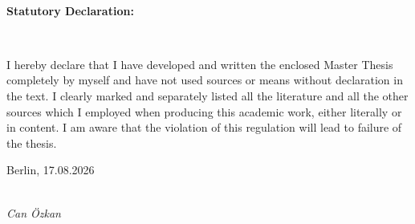 \newpage

\thispagestyle{empty}

\begin{large}

\vspace*{6cm}

\

\large{ \textbf{Statutory Declaration:} }

\

\noindent
I hereby declare that I have developed and written the enclosed Master Thesis completely by myself and have not used sources or means without declaration in the text. 
I clearly marked and separately listed all the literature and all the other sources which I employed when producing this academic work, either literally or in content. 
I am aware that the violation of this regulation will lead to failure of the thesis.
\vspace{2cm}

\noindent
Berlin, 17.08.2026

\vspace{3cm}

\hspace*{7cm}%
\dotfill\\
\hspace*{8.5cm}%
\textit{Can Özkan}

\end{large}
